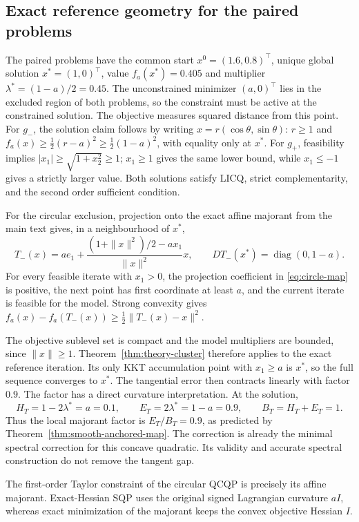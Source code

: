 \documentclass[pdflatex,sn-mathphys-num]{sn-jnl}
\theoremstyle{thmstyleone}
\theoremstyle{thmstylethree}
\begin{document}
\subsection{Exact reference geometry for the paired problems}
The paired problems have the common start $x^0=(1.6,0.8)^\top$,
unique global solution $x^*=(1,0)^\top$, value $f_a(x^*)=0.405$ and
multiplier $\lambda^*=(1-a)/2=0.45$.
The unconstrained minimizer $(a,0)^\top$ lies in the excluded region of
both problems, so the constraint must be active at the constrained
solution. The objective measures squared distance from this point.
For $g_-$, the solution claim follows by writing $x=r(\cos\theta,\sin\theta)$:
$r\geq1$ and
$f_a(x)\geq\tfrac12(r-a)^2\geq\tfrac12(1-a)^2$,
with equality only at $x^*$.
For $g_+$, feasibility implies $|x_1|\geq\sqrt{1+x_2^2}\geq1$;
$x_1\geq1$ gives the same lower bound, while $x_1\leq-1$ gives a
strictly larger value. Both solutions satisfy LICQ, strict
complementarity, and the second order sufficient condition.

For the circular exclusion, projection onto the exact affine majorant
from the main text gives, in a neighbourhood of $x^*$,
\begin{equation}
 T_-(x)=ae_1+\frac{(1+\|x\|^2)/2-ax_1}{\|x\|^2}x,
 \qquad
 DT_-(x^*)=\operatorname{diag}(0,1-a).
 \label{eq:circle-map}
\end{equation}
For every feasible iterate with $x_1>0$, the projection coefficient in
\eqref{eq:circle-map} is positive, the next point has first coordinate
at least $a$, and the current iterate is feasible for the model. Strong convexity gives
$f_a(x)-f_a(T_-(x))\geq\tfrac12\|T_-(x)-x\|^2$.

The objective sublevel set is compact and the model multipliers are
bounded, since $\|x\|\geq1$. Theorem~\ref{thm:theory-cluster}
therefore applies to the exact reference iteration. Its only KKT
accumulation point with $x_1\geq a$ is $x^*$, so the full sequence
converges to $x^*$. The tangential error then contracts linearly with
factor $0.9$.
The factor has a direct curvature interpretation. At the solution,
\[
 H_T=1-2\lambda^*=a=0.1,\qquad
 E_T=2\lambda^*=1-a=0.9,\qquad B_T=H_T+E_T=1.
\]
Thus the local majorant factor is $E_T/B_T=0.9$, as predicted by
Theorem~\ref{thm:smooth-anchored-map}. The correction is already the
minimal spectral correction for this concave quadratic. Its validity and accurate
spectral construction do not remove the tangent gap.

The first-order Taylor constraint of the circular QCQP is precisely
its affine majorant. Exact-Hessian SQP uses the original signed
Lagrangian curvature $aI$, whereas exact minimization of the majorant
keeps the convex objective Hessian $I$.
\end{document}
